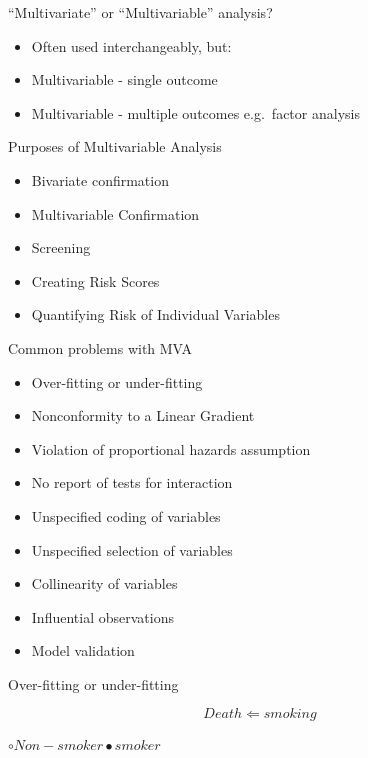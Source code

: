 \documentclass[ignorenonframetext,]{beamer}
\begin{document}
\begin{frame}{``Multivariate'' or ``Multivariable'' analysis?}

\begin{itemize}
\itemsep1pt\parskip0pt
\item
  Often used interchangeably, but:
\item
  Multivariable - single outcome
\item
  Multivariable - multiple outcomes e.g.~factor analysis
\end{itemize}

\end{frame}

\begin{frame}{Purposes of Multivariable Analysis}

\begin{itemize}
\itemsep1pt\parskip0pt
\item
  Bivariate confirmation
\item
  Multivariable Confirmation
\item
  Screening
\item
  Creating Risk Scores
\item
  Quantifying Risk of Individual Variables
\end{itemize}

\end{frame}

\begin{frame}{Common problems with MVA}

\begin{itemize}
\itemsep1pt\parskip0pt
\item
  Over-fitting or under-fitting
\item
  Nonconformity to a Linear Gradient
\item
  Violation of proportional hazards assumption
\item
  No report of tests for interaction
\item
  Unspecified coding of variables
\item
  Unspecified selection of variables
\item
  Collinearity of variables
\item
  Influential observations
\item
  Model validation
\end{itemize}

\end{frame}

\begin{frame}{Over-fitting or under-fitting}

\[
Death \Longleftarrow smoking
\]

\(\circ Non-smoker \bullet smoker\)

\end{frame}
\end{document}
